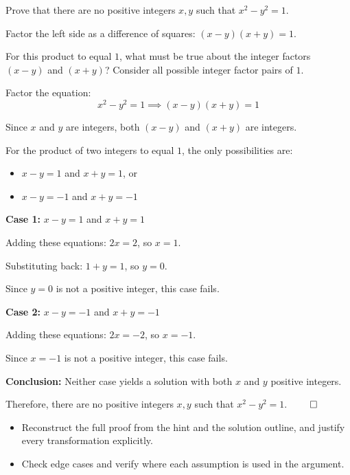 
\begin{problem}
Prove that there are no positive integers $x, y$ such that $x^2 - y^2 = 1$.
\end{problem}

\begin{hint}
Factor the left side as a difference of squares: $(x-y)(x+y) = 1$.

For this product to equal $1$, what must be true about the integer factors $(x-y)$ and $(x+y)$? Consider all possible integer factor pairs of $1$.
\end{hint}

\begin{solution}
Factor the equation:
\[
x^2 - y^2 = 1 \implies (x-y)(x+y) = 1
\]

Since $x$ and $y$ are integers, both $(x-y)$ and $(x+y)$ are integers.

For the product of two integers to equal $1$, the only possibilities are:
\begin{itemize}
\item $x - y = 1$ and $x + y = 1$, or
\item $x - y = -1$ and $x + y = -1$
\end{itemize}

\textbf{Case 1:} $x - y = 1$ and $x + y = 1$

Adding these equations: $2x = 2$, so $x = 1$.

Substituting back: $1 + y = 1$, so $y = 0$.

Since $y = 0$ is not a positive integer, this case fails.

\vspace{0.3cm}

\textbf{Case 2:} $x - y = -1$ and $x + y = -1$

Adding these equations: $2x = -2$, so $x = -1$.

Since $x = -1$ is not a positive integer, this case fails.

\vspace{0.3cm}

\textbf{Conclusion:} Neither case yields a solution with both $x$ and $y$ positive integers.

Therefore, there are no positive integers $x, y$ such that $x^2 - y^2 = 1$. $\qed$
\end{solution}

\begin{takeaways}
\begin{itemize}[leftmargin=*]
\item Reconstruct the full proof from the hint and the solution outline, and justify every transformation explicitly.
\item Check edge cases and verify where each assumption is used in the argument.
\end{itemize}
\end{takeaways}
